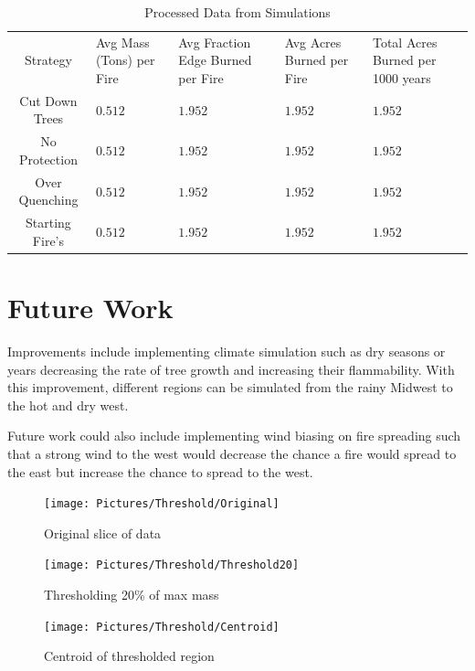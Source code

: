 \documentclass[ aps, pra, reprint, notitlepage ]{revtex4-1}
\begin{document}
\begin{table}[b]%
	\caption{\label{ProcessedData}Processed Data from Simulations}
	\begin{ruledtabular}
		\begin{tabular}{c||p{3cm}|p{3cm}|p{3cm}|p{3cm}}
			Strategy&
			Avg Mass (Tons) per Fire&
			Avg Fraction Edge Burned per Fire&
			Avg Acres Burned per Fire&
			Total Acres Burned per 1000 years\\
			\colrule
			Cut Down Trees & $0.512$ & $1.952$ & $1.952$ & $1.952$\\
			No Protection & $0.512$ & $1.952$ & $1.952$ & $1.952$\\
			Over Quenching & $0.512$ & $1.952$ & $1.952$ & $1.952$\\
			Starting Fire’s & $0.512$ & $1.952$ & $1.952$ & $1.952$\\
		\end{tabular}
	\end{ruledtabular}
\end{table}


\section{\label{FutureWork}Future Work}

Improvements include implementing climate simulation such as dry seasons or years decreasing the rate of tree growth and increasing their flammability. With this improvement, different regions can be simulated from the rainy Midwest to the hot and dry west.

Future work could also include implementing wind biasing on fire spreading such that a strong wind to the west would decrease the chance a fire would spread to the east but increase the chance to spread to the west.

\begin{figure}[ht]
	\texttt{[image: Pictures/Threshold/Original]}
	\caption{\label{ThreshOrig} Original slice of data}
\end{figure}
\begin{figure}[ht]
	\texttt{[image: Pictures/Threshold/Threshold20]}
	\caption{\label{Thresh20} Thresholding 20\% of max mass}
\end{figure}
\begin{figure}[ht]
	\texttt{[image: Pictures/Threshold/Centroid]}
	\caption{\label{Centroid} Centroid of thresholded region}
\end{figure}
\end{document}
